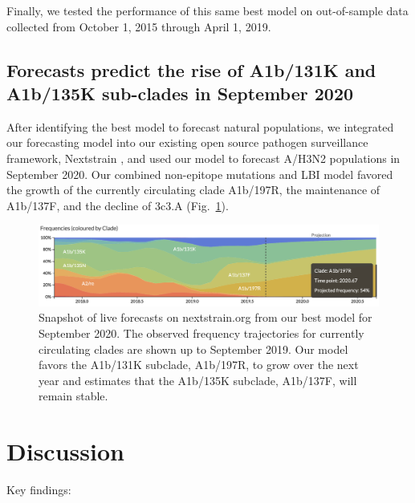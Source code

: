Finally, we tested the performance of this same best model on out-of-sample data collected from October 1, 2015 through April 1, 2019.

\subsection*{Forecasts predict the rise of A1b/131K and A1b/135K sub-clades in September 2020}

After identifying the best model to forecast natural populations, we integrated our forecasting model into our existing open source pathogen surveillance framework, Nextstrain \cite{Hadfield2018}, and used our model to forecast A/H3N2 populations in September 2020.
Our combined non-epitope mutations and LBI model favored the growth of the currently circulating clade A1b/197R, the maintenance of A1b/137F, and the decline of 3c3.A (Fig.~\ref{fig:nextstrain_forecasts}).

\begin{figure}[ht]
  \begin{center}
  \includegraphics[width=\textwidth]{figures/nextstrain-forecasts-for-september-2020.png}
  \caption{
    Snapshot of live forecasts on nextstrain.org from our best model for September 2020.
    The observed frequency trajectories for currently circulating clades are shown up to September 2019.
    Our model favors the A1b/131K subclade, A1b/197R, to grow over the next year and estimates that the A1b/135K subclade, A1b/137F, will remain stable.
  }
  \label{fig:nextstrain_forecasts}
  \end{center}
\end{figure}

\section*{Discussion}

Key findings:

